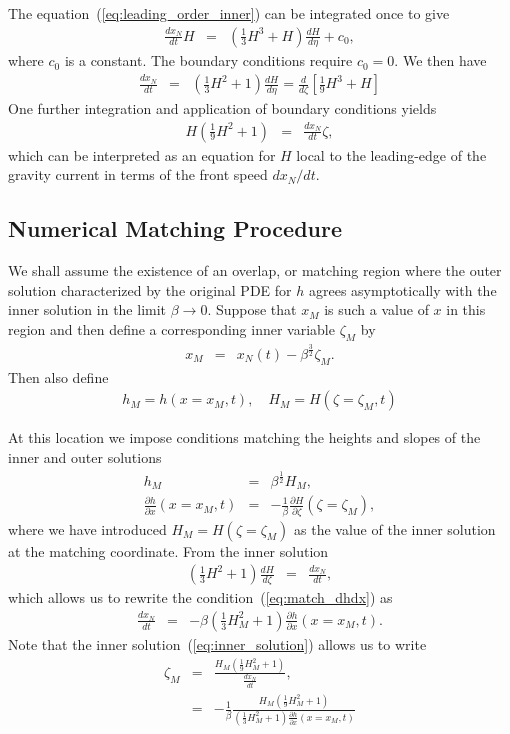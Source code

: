 \documentclass[11pt]{article}
\newcommand{\bea}{\begin{eqnarray}}
\newcommand{\eea}{\end{eqnarray}}
\begin{document}
The equation~(\ref{eq:leading_order_inner}) can be integrated once to give
\bea
\frac{dx_N}{dt} H & = & \left( \frac{1}{3} H^3 + H \right) \frac{dH}{d\eta} + c_0,
\eea
where $c_0$ is a constant.  The boundary conditions require $c_0=0$.  We then have
\bea
\frac{dx_N}{dt} & = & \left( \frac{1}{3} H^2 + 1 \right) \frac{dH}{d\eta} = \frac{d}{d\zeta} \left[ \frac{1}{9} H^3 + H \right]
\eea
One further integration and application of boundary conditions yields
\bea
\label{eq:inner_solution}
H \left( \frac{1}{9} H^2 + 1 \right) & = & \frac{dx_N}{dt} \zeta,
\eea
which can be interpreted as an equation for $H$ local to the leading-edge of the gravity current in terms of the front speed $dx_N/dt$.

\subsection{Numerical Matching Procedure}

We shall assume the existence of an overlap, or matching region where the outer solution characterized by the original PDE for $h$ agrees
asymptotically with the inner solution in the limit $\beta \rightarrow 0$.    Suppose that $x_M$ is such a value of $x$ in this region and then define
a corresponding inner variable $\zeta_M$ by 
\bea
x_M & = & x_N(t) - \beta^{\frac{3}{2}} \zeta_M.
\eea
Then also define
\bea
h_M = h(x=x_M,t),\quad
H_M = H(\zeta=\zeta_M,t)
\eea

At this location we impose conditions matching the heights and slopes of the inner and outer solutions
\bea
\label{eq:match_h}
h_M & = & \beta^{\frac{1}{2}} H_M,\\
\label{eq:match_dhdx}
\frac{\partial h}{\partial x}(x=x_M,t) & = & -\frac{1}{\beta} \frac{\partial H}{\partial \zeta}(\zeta = \zeta_M),
\eea
where we have introduced $H_M = H(\zeta= \zeta_M)$ as the value of the inner solution at the matching coordinate.  
From the inner solution 
\bea
\left( \frac{1}{3} H^2 + 1 \right) \frac{dH}{d\zeta} & = & \frac{dx_N}{dt},
\eea
which allows us to rewrite the condition~(\ref{eq:match_dhdx}) as
\bea
\frac{dx_N}{dt} & = & - \beta \left( \frac{1}{3} H_M^2 + 1 \right) \frac{\partial h}{\partial x}(x=x_M,t).
\eea
Note that the inner solution~(\ref{eq:inner_solution}) allows us to write
\bea
\zeta_M & = & \frac{H_M \left( \frac{1}{9} H_M^2 + 1 \right) }{\frac{dx_N}{dt}},\nonumber \\
 & = & - \frac{1}{\beta} \frac{H_M \left( \frac{1}{9} H_M^2 + 1 \right) }{ \left( \frac{1}{3} H_M^2 + 1 \right) \frac{\partial h}{\partial x}(x=x_M,t) } 
\eea
\end{document}
